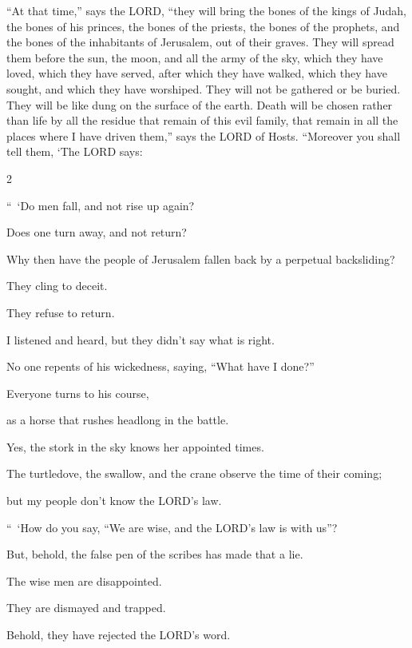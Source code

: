 \mychapter{} \myverse*{}“At that time,” says the LORD, “they will bring the bones of the kings of Judah, the bones of his princes, the bones of the priests, the bones of the prophets, and the bones of the inhabitants of Jerusalem, out of their graves. \myverse{}They will spread them before the sun, the moon, and all the army of the sky, which they have loved, which they have served, after which they have walked, which they have sought, and which they have worshiped. They will not be gathered or be buried. They will be like dung on the surface of the earth. \myverse{}Death will be chosen rather than life by all the residue that remain of this evil family, that remain in all the places where I have driven them,” says the LORD of Hosts. \myverse{}“Moreover you shall tell them, ‘The LORD says:
\begin{multicols}{2}
	
	“ ‘Do men fall, and not rise up again?
	
	Does one turn away, and not return?
	
	
	\myverse{}Why then have the people of Jerusalem fallen back by a perpetual
	backsliding?
	
	They cling to deceit.
	
	They refuse to return.
	
	
	\myverse{}I listened and heard, but they didn’t say what is right.
	
	No one repents of his wickedness, saying, “What have I done?”
	
	Everyone turns to his course,
	
	as a horse that rushes headlong in the battle.
	
	
	\myverse{}Yes, the stork in the sky knows her appointed times.
	
	The turtledove, the swallow, and the crane observe the time of their coming;
	
	but my people don’t know the LORD’s law.
	
	\vspace{\baselineskip}
	
	\myverse{}“ ‘How do you say, “We are wise, and the LORD’s law is with us”?
	
	But, behold, the false pen of the scribes has made that a lie.
	
	
	\myverse{}The wise men are disappointed.
	
	They are dismayed and trapped.
	
	Behold, they have rejected the LORD’s word.
	

\end{multicols}
